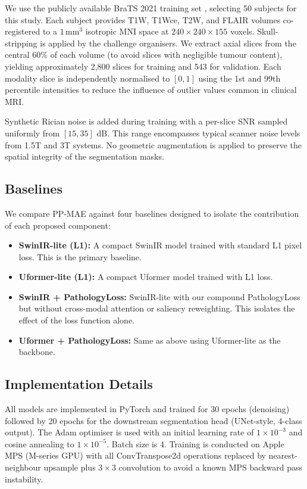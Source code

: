 \documentclass[conference]{IEEEtran}
\begin{document}
We use the publicly available BraTS 2021 training set
\cite{bakas2017brats, bakas2018brats, menze2015brats}, selecting
50 subjects for this study. Each subject provides T1W, T1Wce, T2W,
and FLAIR volumes co-registered to a $1\,\mathrm{mm}^3$ isotropic
MNI space at $240 \times 240 \times 155$ voxels. Skull-stripping
is applied by the challenge organisers. We extract axial slices
from the central 60\% of each volume (to avoid slices with
negligible tumour content), yielding approximately 2,800 slices
for training and 543 for validation. Each modality slice is
independently normalised to $[0,1]$ using the 1st and 99th
percentile intensities to reduce the influence of outlier values
common in clinical MRI.

Synthetic Rician noise is added during training with a
per-slice SNR sampled uniformly from $[15, 35]$ dB. This range
encompasses typical scanner noise levels from 1.5T and 3T systems.
No geometric augmentation is applied to preserve the spatial
integrity of the segmentation masks.

\subsection{Baselines}

We compare PP-MAE against four baselines designed to isolate
the contribution of each proposed component:
\begin{itemize}
  \item \textbf{SwinIR-lite (L1):} A compact SwinIR model
        \cite{liang2021swinir} trained with standard L1 pixel loss.
        This is the primary baseline.
  \item \textbf{Uformer-lite (L1):} A compact Uformer model
        \cite{wang2022uformer} trained with L1 loss.
  \item \textbf{SwinIR + PathologyLoss:} SwinIR-lite with our
        compound PathologyLoss but without cross-modal attention or
        saliency reweighting. This isolates the effect of the loss
        function alone.
  \item \textbf{Uformer + PathologyLoss:} Same as above using
        Uformer-lite as the backbone.
\end{itemize}

\subsection{Implementation Details}

All models are implemented in PyTorch and trained for 30 epochs
(denoising) followed by 20 epochs for the downstream segmentation
head (UNet-style, 4-class output). The Adam optimiser is used with
an initial learning rate of $1 \times 10^{-3}$ and cosine annealing
to $1 \times 10^{-5}$. Batch size is 4. Training is conducted on
Apple MPS (M-series GPU) with all ConvTranspose2d operations replaced
by nearest-neighbour upsample plus $3 \times 3$ convolution to
avoid a known MPS backward pass instability.
\end{document}
